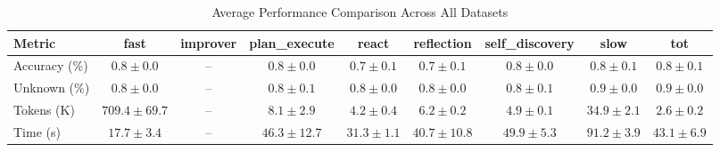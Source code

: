 \begin{table}[ht]
\centering
\caption{Average Performance Comparison Across All Datasets}
\label{tab:performance}
\begin{tabular}{lcccccccc}
\toprule
\textbf{Metric} & \textbf{fast} & \textbf{improver} & \textbf{plan_execute} & \textbf{react} & \textbf{reflection} & \textbf{self_discovery} & \textbf{slow} & \textbf{tot} \\
\midrule
Accuracy (\%) & $0.8 \pm 0.0$ & -- & $0.8 \pm 0.0$ & $0.7 \pm 0.1$ & $0.7 \pm 0.1$ & $0.8 \pm 0.0$ & $0.8 \pm 0.1$ & $0.8 \pm 0.1$ \\
Unknown (\%) & $0.8 \pm 0.0$ & -- & $0.8 \pm 0.1$ & $0.8 \pm 0.0$ & $0.8 \pm 0.0$ & $0.8 \pm 0.1$ & $0.9 \pm 0.0$ & $0.9 \pm 0.0$ \\
Tokens (K) & $709.4 \pm 69.7$ & -- & $8.1 \pm 2.9$ & $4.2 \pm 0.4$ & $6.2 \pm 0.2$ & $4.9 \pm 0.1$ & $34.9 \pm 2.1$ & $2.6 \pm 0.2$ \\
Time (s) & $17.7 \pm 3.4$ & -- & $46.3 \pm 12.7$ & $31.3 \pm 1.1$ & $40.7 \pm 10.8$ & $49.9 \pm 5.3$ & $91.2 \pm 3.9$ & $43.1 \pm 6.9$ \\
\bottomrule
\end{tabular}
\end{table}